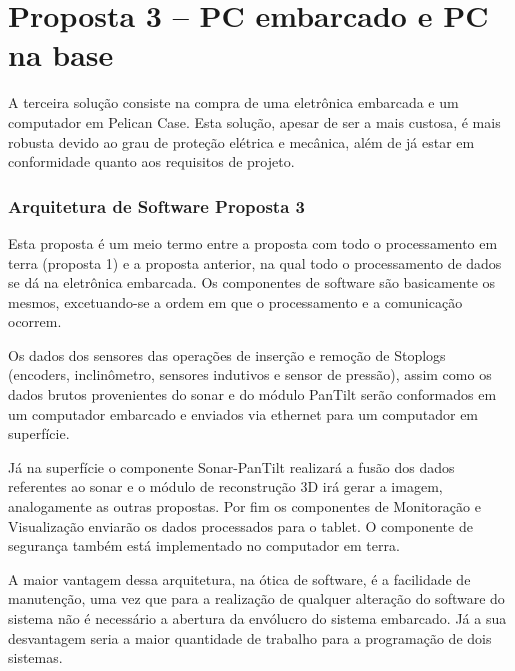 


\section{Proposta 3 – PC embarcado e PC na base}

A terceira solução consiste na compra de uma eletrônica embarcada e um
computador em Pelican Case. Esta solução, apesar de ser a mais custosa, é mais
robusta devido ao grau de proteção elétrica e mecânica, além de já estar em
conformidade quanto aos requisitos de projeto.

\subsubsection{Arquitetura de Software Proposta 3}
Esta proposta é um meio termo entre a proposta com todo o processamento em terra
(proposta 1) e a proposta anterior, na qual todo o processamento de dados se dá
na eletrônica embarcada. Os componentes de software são basicamente os mesmos,
excetuando-se a ordem em que o processamento e a comunicação ocorrem.

Os dados dos sensores das operações de inserção e remoção de Stoplogs
(encoders, inclinômetro, sensores indutivos e sensor de pressão), assim como os
dados brutos provenientes do sonar e do módulo PanTilt serão conformados em um
computador embarcado e enviados via ethernet para um computador em superfície.

Já na superfície o componente Sonar-PanTilt realizará a fusão dos dados
referentes ao sonar e o módulo de reconstrução 3D irá gerar a imagem,
analogamente as outras propostas. Por fim os componentes de Monitoração e
Visualização enviarão os dados processados para o tablet. O componente de
segurança também está implementado no computador em terra.

A maior vantagem dessa arquitetura, na ótica de software, é a facilidade de
manutenção, uma vez que para a realização de qualquer alteração do software do
sistema não é necessário a abertura da envólucro do sistema embarcado. Já a sua
desvantagem seria a maior quantidade de trabalho para a programação de dois
sistemas.